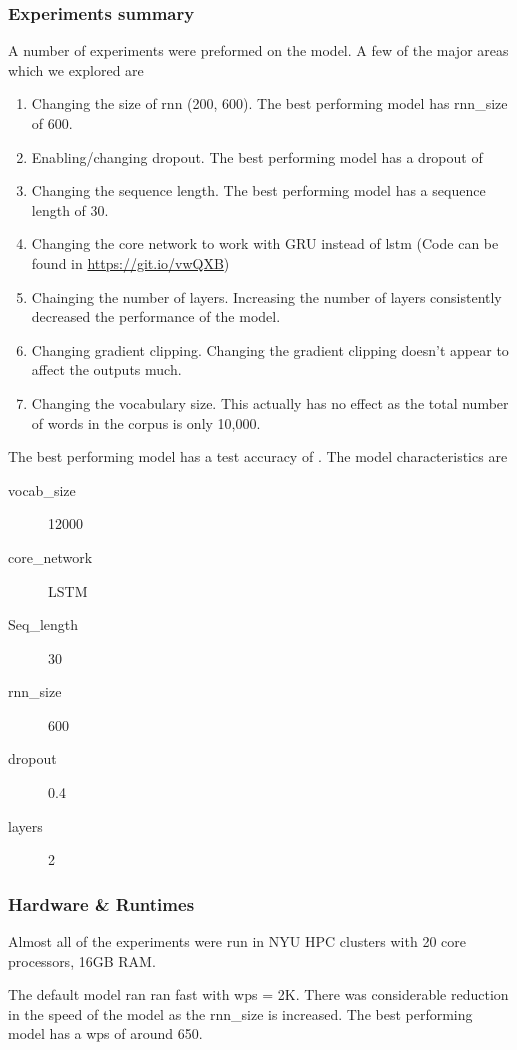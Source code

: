 \documentclass{article}
\begin{document}
\subsubsection{Experiments summary}
A number of experiments were preformed on the model.  A few of the major areas which we explored are
\begin{enumerate}
  \item Changing the size of rnn (200, 600).  The best performing model has rnn\_size of 600.
  \item Enabling/changing dropout.  The best performing model has a dropout of 
  \item Changing the sequence length.  The best performing model has a sequence length of 30.
  \item Changing the core network to work with GRU instead of lstm (Code can be found in \url{https://git.io/vwQXB})
  \item Chainging the number of layers.  Increasing the number of layers consistently decreased the performance of the model.
  \item Changing gradient clipping.  Changing the gradient clipping doesn't appear to affect the outputs much.
  \item Changing the vocabulary size.  This actually has no effect as the total number of words in the corpus is only 10,000.
\end{enumerate}

The best performing model has a test accuracy of \textbf{}.  The model characteristics are
\begin{description}
  \item[vocab\_size] 12000
  \item[core\_network] LSTM
  \item[Seq\_length] 30
  \item[rnn\_size] 600
  \item[dropout] 0.4
  \item[layers] 2
\end{description}


\subsubsection{Hardware \& Runtimes}
Almost all of the experiments were run in NYU HPC clusters with 20 core processors, 16GB RAM\@.

The default model ran ran fast with wps = 2K. There was considerable reduction in the speed of the model as the rnn\_size is increased. The best performing model has a wps of around 650.
\end{document}
